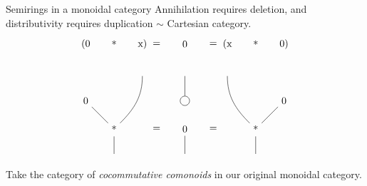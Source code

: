 \documentclass[fleqn]{beamer}
\begin{document}
\begin{frame}{Semirings in a monoidal category}
  Annihilation requires deletion, and distributivity requires duplication
  $\sim$ Cartesian category.
  \[
    \begin{tikzpicture}[baseline]
      \path
      (-3.5,1) node(0l) {0}
      (-1.5,2) node(xl) {}
      (-2.5,0) node(*l) {*}
      (-2.5,-1) node(resl) {}
      ;
      \path
      (-3.5,3) node {(0}
      (-2.5,3) node {*}
      (-1.5,3) node {x)}
      ;

      \draw (0l) -- (*l);
      \draw (xl) to[out=270,in=45] (*l);
      \draw (*l) -- (resl);

      \node at (-1,0) {=};
      \node at (-1,3) {=};

      \path
      (0,0) node(0) {0}
      (0,2) node(x) {}
      (0,-1) node(res) {}
      (0,1) node[circle,draw](del) {}
      ;

      \draw (0) -- (res);
      \draw (x) -- (del);

      \node at (0,3) {0};

      \node at (1,0) {=};
      \node at (1,3) {=};

      \path
      (3.5,1) node(0) {0}
      (1.5,2) node(x) {}
      (2.5,0) node(*) {*}
      (2.5,-1) node(res) {}
      ;
      \path
      (3.5,3) node {0)}
      (2.5,3) node {*}
      (1.5,3) node {(x}
      ;

      \draw (0) -- (*);
      \draw (x) to[out=270,in=135] (*);
      \draw (*) -- (res);
    \end{tikzpicture}
  \]
  Take the category of \emph{cocommutative comonoids} in our original monoidal
  category.
\end{frame}
\end{document}
